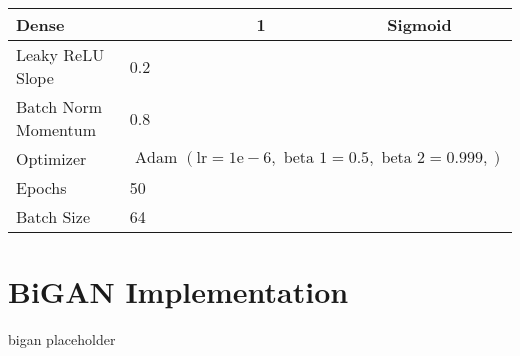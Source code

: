 \begin{table}[]
{\begin{tabular}{llcccc}
			Dense & \multicolumn{1}{c}{} &  & 1 &  & Sigmoid \\ \hline
			Leaky ReLU Slope & \multicolumn{5}{l}{0.2} \\
			Batch Norm Momentum & \multicolumn{5}{l}{0.8} \\
			Optimizer & \multicolumn{5}{l}{$\text { Adam }(\mathrm{lr}=1 \mathrm{e}-6, \text { beta } 1=0.5, \text { beta } 2=0.999,)$} \\ \hline
			Epochs & 50 & \multicolumn{1}{l}{} & \multicolumn{1}{l}{} & \multicolumn{1}{l}{} & \multicolumn{1}{l}{} \\
			Batch Size & \multicolumn{5}{l}{64}
		\end{tabular}%
	}
\end{table}

\section{BiGAN Implementation}

bigan placeholder

